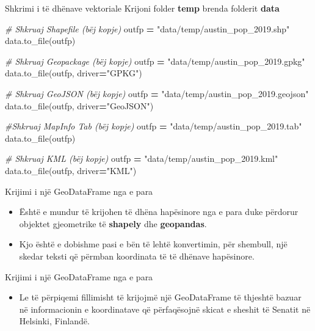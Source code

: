 \documentclass[
  ignorenonframetext,
]{beamer}
\newenvironment{Shaded}{\begin{snugshade}}{\end{snugshade}}
\newcommand{\CommentTok}[1]{\textcolor[rgb]{0.56,0.35,0.01}{\textit{#1}}}
\newcommand{\NormalTok}[1]{#1}
\newcommand{\OperatorTok}[1]{\textcolor[rgb]{0.81,0.36,0.00}{\textbf{#1}}}
\newcommand{\StringTok}[1]{\textcolor[rgb]{0.31,0.60,0.02}{#1}}
\providecommand{\tightlist}{%
  \setlength{\itemsep}{0pt}\setlength{\parskip}{0pt}}
\begin{document}
\begin{frame}[fragile]{Shkrimi i të dhënave vektoriale}
\protect\hypertarget{shkrimi-i-tuxeb-dhuxebnave-vektoriale-1}{}
Krijoni folder \textbf{temp} brenda folderit \textbf{data}


\begin{Shaded}
\begin{Highlighting}[]
\CommentTok{\# Shkruaj Shapefile (bëj kopje)}
\NormalTok{outfp }\OperatorTok{=} \StringTok{"data/temp/austin\_pop\_2019.shp"}
\NormalTok{data.to\_file(outfp)}

\CommentTok{\# Shkruaj Geopackage (bëj kopje)}
\NormalTok{outfp }\OperatorTok{=} \StringTok{"data/temp/austin\_pop\_2019.gpkg"}
\NormalTok{data.to\_file(outfp, driver}\OperatorTok{=}\StringTok{"GPKG"}\NormalTok{)}

\CommentTok{\# Shkruaj GeoJSON (bëj kopje)}
\NormalTok{outfp }\OperatorTok{=} \StringTok{"data/temp/austin\_pop\_2019.geojson"}
\NormalTok{data.to\_file(outfp, driver}\OperatorTok{=}\StringTok{"GeoJSON"}\NormalTok{)}

\CommentTok{\#Shkruaj MapInfo Tab (bëj kopje)}
\NormalTok{outfp }\OperatorTok{=} \StringTok{"data/temp/austin\_pop\_2019.tab"}
\NormalTok{data.to\_file(outfp)}


\CommentTok{\# Shkruaj KML (bëj kopje)}
\NormalTok{outfp }\OperatorTok{=} \StringTok{"data/temp/austin\_pop\_2019.kml"}
\NormalTok{data.to\_file(outfp, driver}\OperatorTok{=}\StringTok{"KML"}\NormalTok{)  }
\end{Highlighting}
\end{Shaded}
\end{frame}

\begin{frame}{Krijimi i një GeoDataFrame nga e para}
\protect\hypertarget{krijimi-i-njuxeb-geodataframe-nga-e-para}{}
\begin{itemize}
\item
  Është e mundur të krijohen të dhëna hapësinore nga e para duke
  përdorur objektet gjeometrike të \textbf{shapely} dhe
  \textbf{geopandas}.
\item
  Kjo është e dobishme pasi e bën të lehtë konvertimin, për shembull,
  një skedar teksti që përmban koordinata të të dhënave hapësinore.
\end{itemize}
\end{frame}

\begin{frame}{Krijimi i një GeoDataFrame nga e para}
\protect\hypertarget{krijimi-i-njuxeb-geodataframe-nga-e-para-1}{}
\begin{itemize}
\tightlist
\item
  Le të përpiqemi fillimisht të krijojmë një GeoDataFrame të thjeshtë
  bazuar në informacionin e koordinatave që përfaqësojnë skicat e
  sheshit të Senatit në Helsinki, Finlandë.
\end{itemize}
\end{frame}
\end{document}

